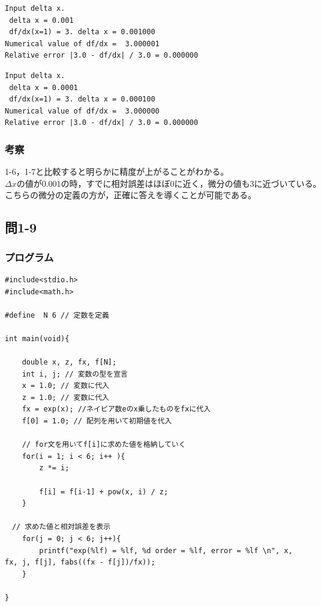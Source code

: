 \documentclass{jarticle}
\begin{document}
\begin{breakbox}
\begin{verbatim}
Input delta x. 
 delta x = 0.001
 df/dx(x=1) = 3. delta x = 0.001000 
Numerical value of df/dx =  3.000001 
Relative error |3.0 - df/dx| / 3.0 = 0.000000 
\end{verbatim}
\end{breakbox}

\begin{breakbox}
\begin{verbatim}
Input delta x. 
 delta x = 0.0001
 df/dx(x=1) = 3. delta x = 0.000100 
Numerical value of df/dx =  3.000000 
Relative error |3.0 - df/dx| / 3.0 = 0.000000 
\end{verbatim}
\end{breakbox}
\subsubsection{考察\\}
1-6，1-7と比較すると明らかに精度が上がることがわかる。\\
$\Delta xの値が0.001の時，すでに相対誤差はほぼ0に近く，微分の値も3に近づいている。$\\
こちらの微分の定義の方が，正確に答えを導くことが可能である。\\

\subsection{問1-9\\}
\subsubsection{プログラム\\}
\begin{breakbox}
\begin{verbatim}
#include<stdio.h>
#include<math.h>

#define  N 6 // 定数を定義

int main(void){

    double x, z, fx, f[N];
    int i, j; // 変数の型を宣言
    x = 1.0; // 変数に代入
    z = 1.0; // 変数に代入
    fx = exp(x); //ネイピア数eのx乗したものをfxに代入
    f[0] = 1.0; // 配列を用いて初期値を代入
    
    // for文を用いてf[i]に求めた値を格納していく
    for(i = 1; i < 6; i++ ){
        z *= i;

        f[i] = f[i-1] + pow(x, i) / z;
    }
    
　// 求めた値と相対誤差を表示
    for(j = 0; j < 6; j++){
        printf("exp(%lf) = %lf, %d order = %lf, error = %lf \n", x, fx, j, f[j], fabs((fx - f[j])/fx));
    }

}
\end{verbatim}
\end{breakbox}
\end{document}
